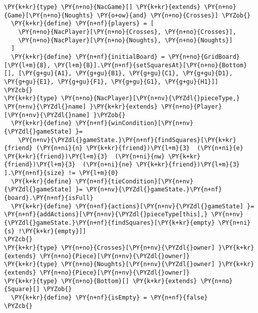 \begin{Verbatim}[commandchars=\\\{\}]
\PY{k+kr}{type} \PY{n+no}{NacGame}[] \PY{k+kr}{extends} \PY{n+no}{Game}[\PY{n+no}{Noughts} \PY{o+ow}{and} \PY{n+no}{Crosses}] \PYZob{}
  \PY{k+kr}{define} \PY{n+nf}{players} = [
    \PY{n+no}{NacPlayer}[\PY{n+no}{Crosses}, \PY{n+no}{Crosses}],
    \PY{n+no}{NacPlayer}[\PY{n+no}{Noughts}, \PY{n+no}{Noughts}]
  ]
  \PY{k+kr}{define} \PY{n+nf}{initialBoard} = \PY{n+no}{GridBoard}[\PY{l+m}{8}, \PY{l+m}{8}].\PY{n+nf}{setSquaresAt}[\PY{n+no}{Bottom}[], [\PY{g+gu}{A1}, \PY{g+gu}{B1}, \PY{g+gu}{C1}, \PY{g+gu}{D1}, \PY{g+gu}{E1}, \PY{g+gu}{F1}, \PY{g+gu}{G1}, \PY{g+gu}{H1}]]
\PYZcb{}
\PY{k+kr}{type} \PY{n+no}{NacPlayer}[\PY{n+nv}{\PYZdl{}pieceType,} \PY{n+nv}{\PYZdl{}name] }\PY{k+kr}{extends} \PY{n+no}{Player}[\PY{n+nv}{\PYZdl{}name] }\PYZob{}
  \PY{k+kr}{define} \PY{n+nf}{winCondition}[\PY{n+nv}{\PYZdl{}gameState] }=
    \PY{n+nv}{\PYZdl{}gameState.}\PY{n+nf}{findSquares}[\PY{k+kr}{friend} (\PY{n+ni}{n} \PY{k+kr}{friend})\PY{l+m}{3}  (\PY{n+ni}{e} \PY{k+kr}{friend})\PY{l+m}{3}  (\PY{n+ni}{nw} \PY{k+kr}{friend})\PY{l+m}{3}  (\PY{n+ni}{ne} \PY{k+kr}{friend})\PY{l+m}{3} ].\PY{n+nf}{size} != \PY{l+m}{0}
  \PY{k+kr}{define} \PY{n+nf}{tieCondition}[\PY{n+nv}{\PYZdl{}gameState] }= \PY{n+nv}{\PYZdl{}gameState.}\PY{n+nf}{board}.\PY{n+nf}{isFull}
  \PY{k+kr}{define} \PY{n+nf}{actions}[\PY{n+nv}{\PYZdl{}gameState] }= \PY{n+nf}{addActions}[\PY{n+nv}{\PYZdl{}pieceType[this],} \PY{n+nv}{\PYZdl{}gameState.}\PY{n+nf}{findSquares}[\PY{k+kr}{empty} \PY{n+ni}{s} !\PY{k+kr}{empty}]]
\PYZcb{}
\PY{k+kr}{type} \PY{n+no}{Crosses}[\PY{n+nv}{\PYZdl{}owner] }\PY{k+kr}{extends} \PY{n+no}{Piece}[\PY{n+nv}{\PYZdl{}owner]}
\PY{k+kr}{type} \PY{n+no}{Noughts}[\PY{n+nv}{\PYZdl{}owner] }\PY{k+kr}{extends} \PY{n+no}{Piece}[\PY{n+nv}{\PYZdl{}owner]}
\PY{k+kr}{type} \PY{n+no}{Bottom}[] \PY{k+kr}{extends} \PY{n+no}{Square}[] \PYZob{}
  \PY{k+kr}{define} \PY{n+nf}{isEmpty} = \PY{n+nf}{false}
\PYZcb{}
\end{Verbatim}
